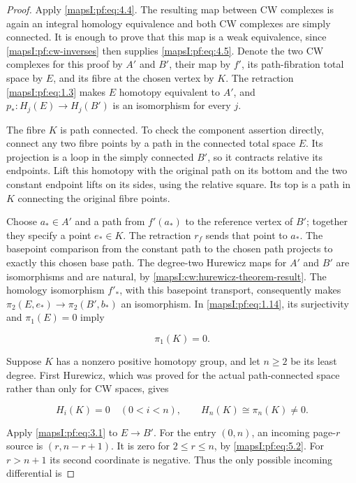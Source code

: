 \begin{proof}
Apply \eqref{mapsI:pf:eq:4.4}. The resulting map between CW complexes is again an integral homology equivalence and both CW complexes are simply connected. It is enough to prove that this map is a weak equivalence, since \cref{mapsI:pf:cw-inverses} then supplies \eqref{mapsI:pf:eq:4.5}. Denote the two CW complexes for this proof by \(A'\) and \(B'\), their map by \(f'\), its path-fibration total space by \(E\), and its fibre at the chosen vertex by \(K\). The retraction \eqref{mapsI:pf:eq:1.3} makes \(E\) homotopy equivalent to \(A'\), and \(p_*:H_j(E)\to H_j(B')\) is an isomorphism for every \(j\).

The fibre \(K\) is path connected. To check the component assertion directly, connect any two fibre points by a path in the connected total space \(E\). Its projection is a loop in the simply connected \(B'\), so it contracts relative its endpoints. Lift this homotopy with the original path on its bottom and the two constant endpoint lifts on its sides, using the relative square. Its top is a path in \(K\) connecting the original fibre points.

Choose \(a_*\in A'\) and a path from \(f'(a_*)\) to the reference vertex of \(B'\); together they specify a point \(e_*\in K\). The retraction \(r_f\) sends that point to \(a_*\). The basepoint comparison from the constant path to the chosen path projects to exactly this chosen base path. The degree-two Hurewicz maps for \(A'\) and \(B'\) are isomorphisms and are natural, by \cref{mapsI:cw:hurewicz-theorem-result}. The homology isomorphism \(f'_*\), with this basepoint transport, consequently makes \(\pi_2(E,e_*)\to\pi_2(B',b_*)\) an isomorphism. In \eqref{mapsI:pf:eq:1.14}, its surjectivity and \(\pi_1(E)=0\) imply

\begin{equation}
\pi_1(K)=0.
\label{mapsI:pf:eq:5.1}
\end{equation}

Suppose \(K\) has a nonzero positive homotopy group, and let \(n\geq2\) be its least degree. First Hurewicz, which was proved for the actual path-connected space rather than only for CW spaces, gives

\begin{equation}
H_i(K)=0\quad(0<i<n),\qquad
H_n(K)\cong\pi_n(K)\ne0.
\label{mapsI:pf:eq:5.2}
\end{equation}

Apply \eqref{mapsI:pf:eq:3.1} to \(E\to B'\). For the entry \((0,n)\), an incoming page-\(r\) source is \((r,n-r+1)\). It is zero for \(2\leq r\leq n\), by \eqref{mapsI:pf:eq:5.2}. For \(r>n+1\) its second coordinate is negative. Thus the only possible incoming differential is


\end{proof}

